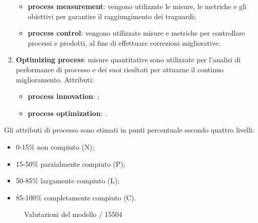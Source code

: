 \begin{enumerate}
\begin{itemize}
			\item \textbf{process measurement}: vengono utilizzate le misure, le metriche e gli obiettivi per garantire il raggiungimento dei traguardi;
			\item \textbf{process control}: vengono utilizzate misure e metriche per controllare processi e prodotti, al fine di effettuare correzioni migliorative.
		\end{itemize}
	\item \textbf{Optimizing process}: misure quantitative sono utilizzate per l'analisi di performance di processo e dei suoi risultati per attuarne il continuo miglioramento. Attributi:
		\begin{itemize}
			\item \textbf{process innovation}: ;
			\item \textbf{process optimization}: .
		\end{itemize}
\end{enumerate}
Gli attributi di processo sono stimati in punti percentuale secondo quattro livelli: 
\begin{itemize}
	\item 0-15\% non compiuto (N);
	\item 15-50\% parzialmente compiuto (P);
	\item 50-85\% largamente compiuto (L);
	\item 85-100\% completamente compiuto (C).
\end{itemize}
\begin{figure}[H]
	\centering
	
	\caption{Valutazioni del modello / 15504}
\end{figure}